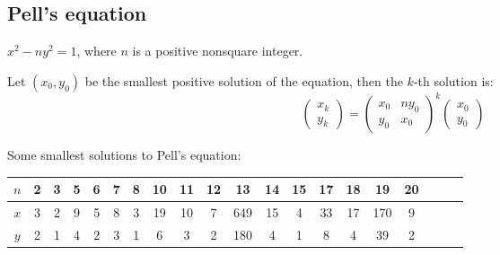 \subsection{Pell's equation}
$x^2 - ny^2 = 1$, where $n$ is a positive nonsquare integer. \par
Let $(x_0, y_0)$ be the smallest positive solution of the equation, then the $k$-th solution is:
$$\begin{pmatrix}x_k \\ y_k\end{pmatrix} =
\begin{pmatrix}
  x_0 & ny_0 \\
  y_0 & x_0
\end{pmatrix} ^k
\begin{pmatrix}x_0 \\ y_0\end{pmatrix}$$

Some smallest solutions to Pell's equation:

\begin{table}[h]
  \centering
  \begin{tabular}{|c|c|c|c|c|c|c|c|c|c|c|c|c|c|c|c|c|c|c|c|}
  \hline
  $n$ & 2 & 3 & 5 & 6 & 7 & 8 & 10 & 11 & 12 & 13  & 14 & 15 & 17 & 18 & 19 & 20 \\ \hline
  $x$ & 3 & 2 & 9 & 5 & 8 & 3 & 19 & 10 & 7  & 649 & 15 & 4 & 33 & 17 & 170 & 9 \\ \hline
  $y$ & 2 & 1 & 4 & 2 & 3 & 1 & 6  & 3  & 2  & 180 & 4  & 1 & 8 & 4 & 39 & 2 \\ \hline
  \end{tabular}
\end{table}




